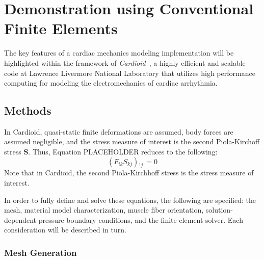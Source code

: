 \section{Demonstration using Conventional Finite Elements}

The key features of a cardiac mechanics modeling implementation will be highlighted within the framework of \textit{Cardioid}~\cite{richards_2013, gurev_2015}, a highly efficient and scalable code at Lawrence Livermore National Laboratory that utilizes high performance computing for modeling the electromechanics of cardiac arrhythmia.

\subsection{Methods}
\label{Methods}

In Cardioid, quasi-static finite deformations are assumed, body forces are assumed negligible, and the stress measure of interest is the second Piola-Kirchoff stress $\bm{S}$. Thus, Equation PLACEHOLDER reduces to the following:
\begin{equation}
(F_{ik}S_{kj}),_{j} = 0
\end{equation}
Note that in Cardioid, the second Piola-Kirchhoff stress is the stress measure of interest.

In order to fully define and solve these equations, the following are specified: the mesh, material model characterization, muscle fiber orientation, solution-dependent pressure boundary conditions, and the finite element solver. Each consideration will be described in turn.

\subsubsection{Mesh Generation}
\label{Mesh Generation}

